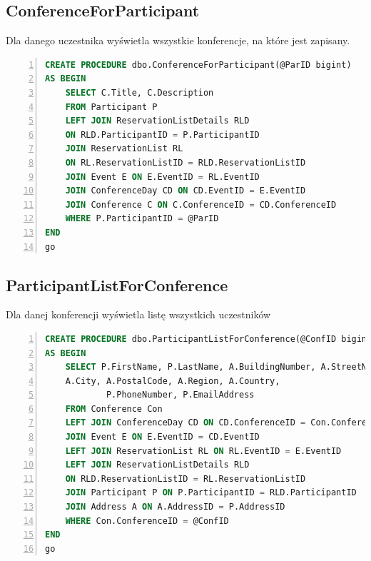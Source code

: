 \documentclass[]{article}
\begin{document}
	\subsection{ConferenceForParticipant}
	Dla danego uczestnika wyświetla wszystkie konferencje, na które jest zapisany.
	\begin{lstlisting}[language=SQL,
						showspaces=false,
						basicstyle=\ttfamily,
						numbers=left,
						numberstyle=\tiny,
						backgroundcolor=\color{lightg},
						keywordstyle=\color{lightblue},
						commentstyle=\color{gray}]
CREATE PROCEDURE dbo.ConferenceForParticipant(@ParID bigint)
AS BEGIN
	SELECT C.Title, C.Description
	FROM Participant P
	LEFT JOIN ReservationListDetails RLD
	ON RLD.ParticipantID = P.ParticipantID
	JOIN ReservationList RL
	ON RL.ReservationListID = RLD.ReservationListID
	JOIN Event E ON E.EventID = RL.EventID
	JOIN ConferenceDay CD ON CD.EventID = E.EventID
	JOIN Conference C ON C.ConferenceID = CD.ConferenceID
	WHERE P.ParticipantID = @ParID
END
go
	\end{lstlisting}
	
	\subsection{ParticipantListForConference}
	Dla danej konferencji wyświetla listę wszystkich uczestników
	\begin{lstlisting}[language=SQL,
						showspaces=false,
						basicstyle=\ttfamily,
						numbers=left,
						numberstyle=\tiny,
						backgroundcolor=\color{lightg},
						keywordstyle=\color{lightblue},
						commentstyle=\color{gray}]
CREATE PROCEDURE dbo.ParticipantListForConference(@ConfID bigint)
AS BEGIN
	SELECT P.FirstName, P.LastName, A.BuildingNumber, A.StreetName,
	A.City, A.PostalCode, A.Region, A.Country,
			P.PhoneNumber, P.EmailAddress
	FROM Conference Con
	LEFT JOIN ConferenceDay CD ON CD.ConferenceID = Con.ConferenceID
	JOIN Event E ON E.EventID = CD.EventID
	LEFT JOIN ReservationList RL ON RL.EventID = E.EventID
	LEFT JOIN ReservationListDetails RLD
	ON RLD.ReservationListID = RL.ReservationListID
	JOIN Participant P ON P.ParticipantID = RLD.ParticipantID
	JOIN Address A ON A.AddressID = P.AddressID
	WHERE Con.ConferenceID = @ConfID
END
go
	\end{lstlisting}
\end{document}
